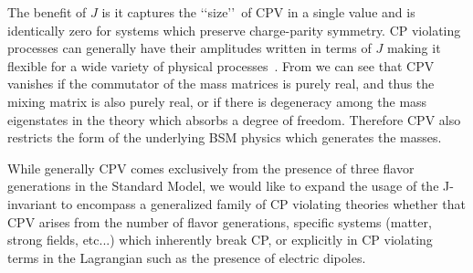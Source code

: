 The benefit of $J$ is it captures the \lq\lq size\rq\rq\ of CPV in a single value and is identically zero for systems which preserve charge-parity symmetry. CP violating processes can generally have their amplitudes written in terms of $J$ making it flexible for a wide variety of physical processes~\citep{harrison2000cp,balaji2020cpb}. From  we can see that CPV vanishes if the commutator of the mass matrices is purely real, and thus the mixing matrix is also purely real, or if there is degeneracy among the mass eigenstates in the theory which absorbs a degree of freedom. Therefore CPV also restricts the form of the underlying BSM physics which generates the masses.

While generally CPV comes exclusively from the presence of three flavor generations in the Standard Model, we would like to expand the usage of the J-invariant to encompass a generalized family of CP violating theories whether that CPV arises from the number of flavor generations, specific systems (matter, strong fields, etc...) which inherently break CP, or explicitly in CP violating terms in the Lagrangian such as the presence of electric dipoles.

